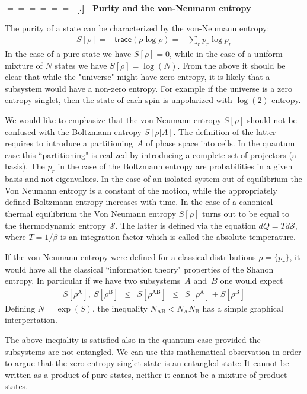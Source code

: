 \documentclass[onecolumn,fleqn]{revtex4}
\newcommand{\trc}{\mathsf{trace}}
\newcommand{\tbox}[1]{\text{#1}}
\newcommand{\beq}{\begin{eqnarray}}
\newcommand{\eeq}{\end{eqnarray}}
\renewcommand{\thesubsection}{\arabic{subsection}}
\renewcommand{\thesubsubsection}{\arabic{subsubsection}}
\newcommand{\sheadC}[1]
{
\addtocounter{subsubsection}{1}
\vspace{5mm}
{\Large\bf $=\!=\!=\!=\!=\!=\;$ [\thesubsection.\thesubsubsection] \ #1}  
\nopagebreak
\phantomsection
}
\begin{document}
\sheadC{Purity and the von-Neumann entropy}


The purity of a state can be characterized 
by the von-Neumann entropy:  
\beq
S[\rho] = -\trc(\rho\log\rho)  = -\sum_{r} p_{r} \log{p_{r}} 
\eeq
In the case of a pure state we have $S[\rho]=0$, 
while in the case of a uniform mixture of $N$ states we have $S[\rho]=\log(N)$.  
From the above it should be clear that while the "universe" 
might have zero entropy, it is likely that a subsystem  
would have a non-zero entropy. For example if the universe 
is a zero entropy singlet, then the state of each spin 
is unpolarized with $\log(2)$ entropy. 

We would like to emphasize that the von-Neumann entropy $S[\rho]$ 
should not be confused with the Boltzmann entropy $S[\rho|A]$. 
The definition of the latter requires to introduce 
a partitioning~$A$ of phase space into cells.  
In the quantum case this ``partitioning"  is realized 
by introducing a complete set of projectors (a basis).  
The $p_r$ in the case of the Boltzmann entropy 
are probabilities in a given basis and not eigenvalues.
In the case of an isolated system out of equilibrium 
the Von Neumann entropy is a constant of the motion, 
while the appropriately defined Boltzmann entropy increases with time. 
In the case of a canonical thermal equilibrium  
the Von Neumann entropy $S[\rho]$ turns out to be equal 
to the thermodynamic entropy~$\mathcal{S}$. 
The latter is defined via the equation $dQ=Td\mathcal{S}$, 
where $T=1/\beta$ is an integration factor 
which is called the absolute temperature.

If the von-Neumann entropy were defined for a classical 
distributions ${\rho=\{p_r\}}$, it would have all the 
classical ``information theory" properties of the Shanon entropy.
In particular if we have two subsystems~$A$ and~$B$ one 
would expect 
\beq
S[\rho^{\tbox{A}}], \ S[\rho^{\tbox{B}}] 
\ \ \le \ \ 
S[\rho^{\tbox{AB}}]
\ \ \le \ \ 
S[\rho^{\tbox{A}}]+S[\rho^{\tbox{B}}]
\eeq 
Defining $N=\exp(S)$, the inequality ${N_{\tbox{AB}}<N_{\tbox{A}}N_{\tbox{B}}}$ 
has a simple graphical interpertation. 



The above ineqiality is satisfied also in the  
quantum case provided the subsystems are not entangled. 
We can use this mathematical observation in order 
to argue that the zero entropy singlet state 
is an entangled state: It cannot be written as a product 
of pure states, neither it cannot be a mixture of product states. 
\end{document}
